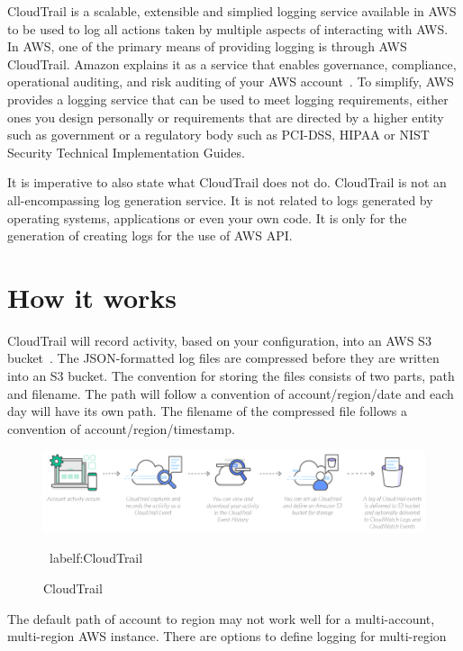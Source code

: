 CloudTrail is a scalable, extensible and simplied logging service available 
in AWS to be used to log all actions taken by multiple aspects of interacting
with AWS\@. In AWS, one of the primary means of providing logging is through
AWS 
CloudTrail. Amazon explains it as a service that enables governance, 
compliance, operational auditing, and risk auditing of your AWS 
account~\cite{hid-sp18-518-CloudTrail-user-guide}. To simplify, AWS provides 
a logging service that can be used to meet logging requirements, either ones
you design personally or requirements that are directed by a higher entity 
such as government or a regulatory body such as PCI-DSS, HIPAA or NIST
Security Technical Implementation Guides.

It is imperative to also state what CloudTrail does not do. CloudTrail is
not an all-encompassing log generation service. It is not related to logs 
generated by operating systems, applications or even your own code. It is 
only for the generation of creating logs for the use of AWS API\@.

\section{How it works}

CloudTrail will record activity, based on your configuration, into an 
AWS S3 bucket~\cite{hid-sp18-518-CloudTrail-log-example}.
The JSON-formatted log files are compressed before they are written into an 
S3 bucket. The convention for storing the files consists of two 
parts, path and filename. The path will follow a convention of 
account/region/date and each day will have its own path.  The filename of the 
compressed file follows a convention of account/region/timestamp. 

\begin{figure}[!ht]
	\centering\includegraphics[width=\columnwidth]{images/Cloudtrail-How-it-works.png}
	\caption{CloudTrail~\cite{hid-sp18-518-CloudTrail-CloudFormation-Image}}\
label{f:CloudTrail}
\end{figure}

The default path of account to region may not work well for a multi-account, 
multi-region AWS instance. There are options to define logging for multi-region

